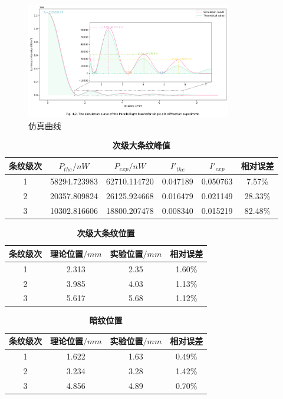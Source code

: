 \documentclass[12pt,a4paper,UTF8]{ctexart}
\begin{document}
\begin{figure}[htbp]
	\centering
	\includegraphics[width=0.8\textwidth]{attachments//Fig.4.2.png}
	\caption{仿真曲线}
	\label{fig:4.2}
\end{figure}

\begin{table}[htbp]
	\centering
	\begin{tabular}{cccccc}
	\toprule
	条纹级次 &$P_{the}/nW$ &$P_{exp}/nW$ &$I'_{the}$ &$I'_{exp}$ &相对误差 \\
	\midrule
	1  &58294.723983  &62710.114720  &0.047189  &0.050763  &7.57\% \\
	2  &20357.809824  &26125.924668  &0.016479  &0.021149  &28.33\% \\
	3  &10302.816606  &18800.207478  &0.008340  &0.015219  &82.48\% \\
	\bottomrule
    \end{tabular}
	\caption{\textbf{次级大条纹峰值}}
	\label{tab:4.1}
\end{table}


\begin{table}[htbp]
	\centering
		\begin{tabular}{cccc}
			\toprule
			条纹级次	&理论位置$/mm$	&实验位置$/mm$	&相对误差 \\
			\midrule
			1  &2.313  &2.35  &1.60\% \\
			2  &3.985  &4.03  &1.13\% \\
			3  &5.617  &5.68  &1.12\% \\	
			\bottomrule
		\end{tabular}
		\caption{\textbf{次级大条纹位置}}
		\label{tab:4.2}
\end{table}
\begin{table}[htbp]
	\centering
		\begin{tabular}{cccc}
			\toprule
			条纹级次	&理论位置$/mm$	&实验位置$/mm$	&相对误差 \\
			\midrule
			1  &1.622  &1.63  &0.49\% \\
			2  &3.234  &3.28   &1.42\% \\
			3  &4.856  &4.89   &0.70\% \\	
			\bottomrule
		\end{tabular}
		\caption{\textbf{暗纹位置}}
		\label{tab:4.3}
\end{table}
\end{document}
